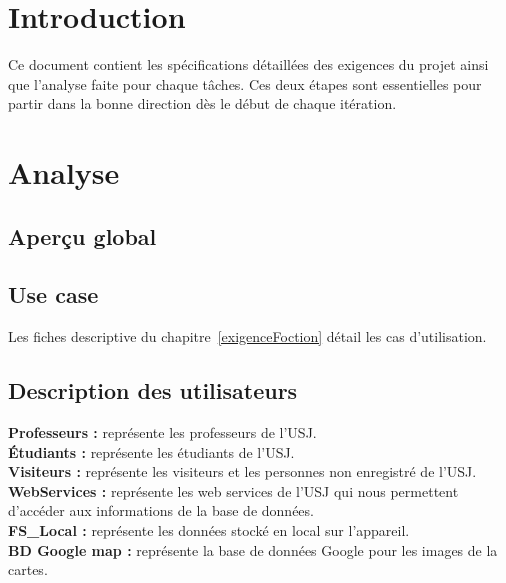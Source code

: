 \section{Introduction}
Ce document contient les spécifications détaillées des exigences du projet ainsi que l'analyse faite pour chaque tâches. Ces deux étapes sont essentielles pour partir dans la bonne direction dès le début de chaque itération. 
\section{Analyse}
	\subsection{ Aperçu global}
	\subsection{Use case}
	 Les fiches descriptive du chapitre~\ref{exigenceFoction} détail les cas d'utilisation.
	\subsection{Description des utilisateurs}
		\textbf{Professeurs :} représente les professeurs de l'USJ.\\[0.2cm]
		\textbf{Étudiants :} représente les étudiants de l'USJ.\\[0.2cm]
		\textbf{Visiteurs :} représente les visiteurs et les personnes non enregistré de l'USJ.\\[0.2cm]
		\textbf{WebServices :} représente les web services de l'\gls{USJ} qui nous permettent d'accéder aux informations de la base de données.\\[0.2cm]
		\textbf{FS\_Local :} représente les données stocké en local sur l'appareil.\\[0.2cm]
		\textbf{BD Google map :} représente la base de données Google pour les images de la cartes.\\[0.2cm]
		
